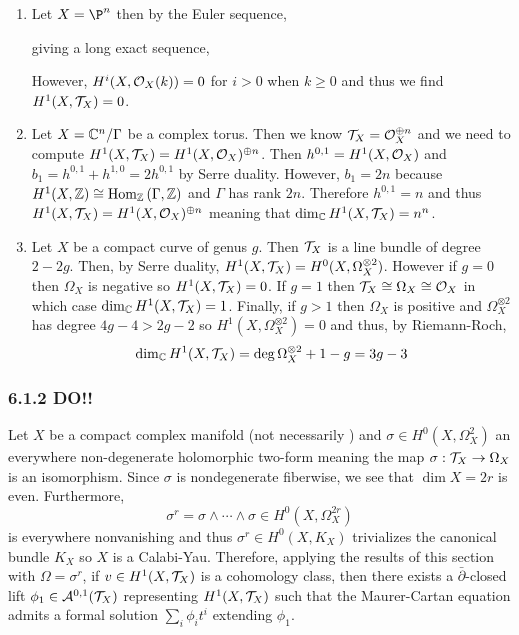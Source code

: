 \documentclass[12pt]{article}
\begin{document}
\begin{enumerate}
\item Let $X = \P^n$ then by the Euler sequence,
\begin{center}
\end{center}
giving a long exact sequence,
\begin{center}
\end{center}
However, $H^i(X, \mathcal{O}_{X}(k)) = 0$ for $i > 0$ when $k \ge 0$ and thus we find $H^1(X, \mathcal{T}_X) = 0$.

\item Let $X = \mathbb{C}^n / \Gamma$ be a complex torus. Then we know $\mathcal{T}_X = \mathcal{O}_{X}^{\oplus n}$ and we need to compute $H^1(X, \mathcal{T}_X) = H^1(X, \mathcal{O}_{X})^{\oplus n}$. Then $h^{0,1} = H^1(X, \mathcal{O}_{X})$ and $b_1 = h^{0,1} + h^{1,0} = 2 h^{0,1}$ by Serre duality. However, $b_1 = 2n$ because $H^1(X, \mathbb{Z}) \cong \mathrm{Hom}_{\mathbb{Z}} \left( \Gamma, \mathbb{Z} \right)$ and $\Gamma$ has rank $2n$. Therefore $h^{0,1} = n$ and thus $H^1(X, \mathcal{T}_X) = H^1(X, \mathcal{O}_{X})^{\oplus n}$ meaning that $\dim_{\mathbb{C}} H^1(X, \mathcal{T}_X) = n^n$. 

\item Let $X$ be a compact curve of genus $g$. Then $\mathcal{T}_X$ is a line bundle of degree $2 - 2 g$. Then, by Serre duality, $H^1(X, \mathcal{T}_X) = H^0(X, \Omega_X^{\otimes 2})$. However if $g = 0$ then $\Omega_X$ is negative so $H^1(X, \mathcal{T}_X) = 0$. If $g = 1$ then $\mathcal{T}_X \cong \Omega_X \cong \mathcal{O}_{X}$ in which case $\dim_{\mathbb{C}} H^1(X, \mathcal{T}_X) = 1$. Finally, if $g > 1$ then $\Omega_X$ is positive and $\Omega_X^{\otimes 2}$ has degree $4g - 4 > 2g - 2$ so $H^1(X, \Omega_X^{\otimes 2}) = 0$ and thus, by Riemann-Roch,
\[ \dim_{\mathbb{C}} H^1(X, \mathcal{T}_X) = \deg{\Omega_X^{\otimes 2}} + 1 - g = 3g - 3 \] 
\end{enumerate}

\subsubsection{6.1.2 DO!!}

Let $X$ be a compact complex manifold (not necessarily \kahler) and $\sigma \in H^0(X, \Omega_X^2)$ an everywhere non-degenerate holomorphic two-form meaning the map $\sigma : \mathcal{T}_X \to \Omega_X$ is an isomorphism. Since $\sigma$ is nondegenerate fiberwise, we see that $\dim{X} = 2r$ is even. Furthermore, 
\[ \sigma^r = \sigma \wedge \cdots \wedge \sigma \in H^0(X, \Omega_X^{2r}) \]
is everywhere nonvanishing and thus $\sigma^r \in H^0(X, K_X)$ trivializes the canonical bundle $K_X$ so $X$ is a Calabi-Yau. Therefore, applying the results of this section with $\Omega = \sigma^r$, if $v \in H^1(X, \mathcal{T}_X)$ is a cohomology class, then there exists a $\bar{\partial}$-closed lift $\phi_1 \in \mathcal{A}^{0,1}(\mathcal{T}_X)$ representing $H^1(X, \mathcal{T}_X)$ such that the Maurer-Cartan equation admits a formal solution $\sum_i \phi_i t^i$ extending $\phi_1$.
\end{document}
